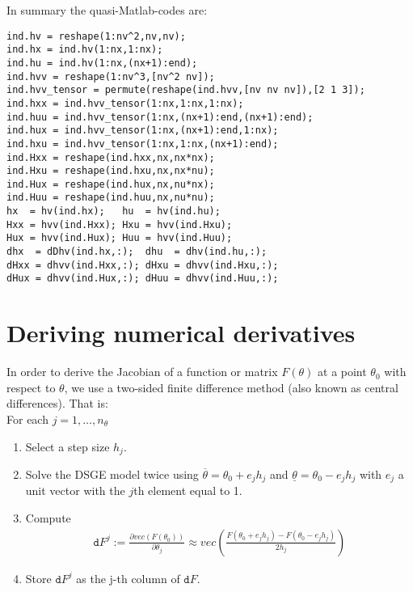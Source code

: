 \documentclass{article}
\begin{document}
In summary the quasi-Matlab-codes are:
\scriptsize\begin{verbatim}
ind.hv = reshape(1:nv^2,nv,nv);
ind.hx = ind.hv(1:nx,1:nx);
ind.hu = ind.hv(1:nx,(nx+1):end);
ind.hvv = reshape(1:nv^3,[nv^2 nv]);
ind.hvv_tensor = permute(reshape(ind.hvv,[nv nv nv]),[2 1 3]);
ind.hxx = ind.hvv_tensor(1:nx,1:nx,1:nx);
ind.huu = ind.hvv_tensor(1:nx,(nx+1):end,(nx+1):end);
ind.hux = ind.hvv_tensor(1:nx,(nx+1):end,1:nx);
ind.hxu = ind.hvv_tensor(1:nx,1:nx,(nx+1):end);
ind.Hxx = reshape(ind.hxx,nx,nx*nx);
ind.Hxu = reshape(ind.hxu,nx,nx*nu);
ind.Hux = reshape(ind.hux,nx,nu*nx);
ind.Huu = reshape(ind.huu,nx,nu*nu);
hx  = hv(ind.hx);   hu  = hv(ind.hu);
Hxx = hvv(ind.Hxx); Hxu = hvv(ind.Hxu);
Hux = hvv(ind.Hux); Huu = hvv(ind.Huu);
dhx  = dDhv(ind.hx,:);  dhu  = dhv(ind.hu,:);
dHxx = dhvv(ind.Hxx,:); dHxu = dhvv(ind.Hxu,:);
dHux = dhvv(ind.Hux,:); dHuu = dhvv(ind.Huu,:);
\end{verbatim}

\section{Deriving numerical derivatives}\label{App:NumDeriv}
In order to derive the Jacobian of a function or matrix $F(\theta)$ at a point $\theta_0$ with respect to $\theta$, we use a two-sided finite difference method (also known as central differences). That is: \\
For each $j=1,\dots,n_\theta$
\begin{enumerate}
\item Select a step size $h_j$.
\item Solve the DSGE model twice using $\overline{\theta}=\theta_0 + e_j h_j$ and $\underline{\theta}=\theta_0 - e_j h_j$ with $e_j$ a unit vector with the $j$th element equal to 1.
\item Compute
\begin{align*}
 \texttt{d}F^j :=  \frac{\partial vec(F(\theta_0))}{\partial \theta_j} \approx vec\left(\frac{F(\theta_0 + e_j h_j)-F(\theta_0-e_j h_j)}{2 h_j}\right)
\end{align*}
\item Store $\texttt{d}F^j$ as the j-th column of $\texttt{d}F$.
\end{enumerate}
\end{document}
